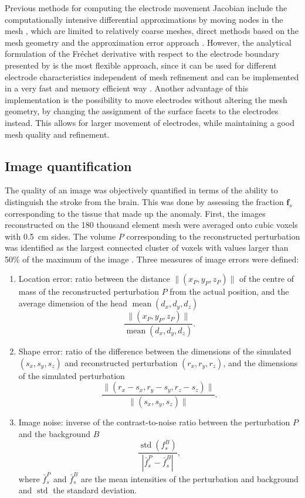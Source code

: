 Previous methods for computing the electrode movement Jacobian include the computationally intensive differential approximations by moving nodes in the mesh \citep{Soleimani2006}, which are limited to relatively coarse meshes, direct methods based on the mesh geometry \citep{Gomez-Laberge2008} and the approximation error approach \citep{Nissinen2011}. However, the analytical formulation of the Fr\'{e}chet derivative with respect to the electrode boundary presented by \citet{Darde2012} is the most flexible approach, since it can be used for different electrode characteristics independent of mesh refinement and can be implemented in a very fast and memory efficient way \citep{Jehl2015b}. Another advantage of this implementation is the possibility to move electrodes without altering the mesh geometry, by changing the assignment of the surface facets to the electrodes instead. This allows for larger movement of electrodes, while maintaining a good mesh quality and refinement.

\subsection{Image quantification}

The quality of an image was objectively quantified in terms of the ability to distinguish the stroke from the brain. This was done by assessing the fraction $\boldsymbol{f}_s$ corresponding to the tissue that made up the anomaly. First, the images reconstructed on the 180 thousand element mesh were averaged onto cubic voxels with \SI{0.5}{\centi\metre} sides. The volume $P$ corresponding to the reconstructed perturbation was identified as the largest connected cluster of voxels with values larger than 50\% of the maximum of the image \citep{Malone2013, Jehl2015b}. Three measures of image errors were defined:
\begin{enumerate}
\item Location error: ratio between the distance $\lVert(x_P, y_P, z_P)\rVert$ of the centre of mass of the reconstructed perturbation $P$ from the actual position, and the average dimension of the head $\operatorname{mean}(d_x,d_y,d_z)$
\begin{equation}
\frac{\lVert (x_P, y_P, z_P) \rVert}{\operatorname{mean}(d_x,d_y,d_z)}.
\end{equation}
\item Shape error: ratio of the difference between the dimensions of the simulated $(s_x,s_y,s_z)$ and reconstructed perturbation $(r_x,r_y,r_z)$, and the dimensions of the simulated perturbation
\begin{equation}
\frac{\lVert (r_x-s_x, r_y-s_y, r_z-s_z) \rVert}{\lVert (s_x, s_y, s_z) \rVert}.
\end{equation}
\item Image noise: inverse of the contrast-to-noise ratio between the perturbation $P$ and the background $B$
\begin{equation}
\frac{\operatorname{std}(f_s^B)}{\left|\bar{f}_s^P-\bar{f}_s^B\right|},
\end{equation}
where $\bar{f}_s^P$ and $\bar{f}_s^B$ are the mean intensities of the perturbation and background and $\operatorname{std}$ the standard deviation.
\end{enumerate}